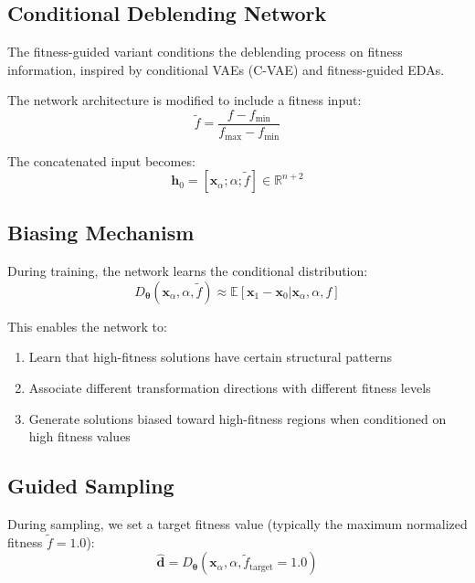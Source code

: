 \documentclass[11pt,a4paper]{article}
\newcommand{\R}{\mathbb{R}}
\newcommand{\E}{\mathbb{E}}
\newcommand{\vx}{\mathbf{x}}
\newcommand{\vtheta}{\boldsymbol{\theta}}
\begin{document}
\subsection{Conditional Deblending Network}

The fitness-guided variant conditions the deblending process on fitness information, inspired by conditional VAEs (C-VAE) and fitness-guided EDAs.

The network architecture is modified to include a fitness input:
\begin{equation}
    \tilde{f} = \frac{f - f_{\min}}{f_{\max} - f_{\min}}
\end{equation}

The concatenated input becomes:
\begin{equation}
    \mathbf{h}_0 = [\vx_\alpha; \alpha; \tilde{f}] \in \R^{n + 2}
\end{equation}

\subsection{Biasing Mechanism}

During training, the network learns the conditional distribution:
\begin{equation}
    D_\vtheta(\vx_\alpha, \alpha, \tilde{f}) \approx \E[\vx_1 - \vx_0 | \vx_\alpha, \alpha, f]
\end{equation}

This enables the network to:
\begin{enumerate}
    \item Learn that high-fitness solutions have certain structural patterns
    \item Associate different transformation directions with different fitness levels
    \item Generate solutions biased toward high-fitness regions when conditioned on high fitness values
\end{enumerate}

\subsection{Guided Sampling}

During sampling, we set a target fitness value (typically the maximum normalized fitness $\tilde{f} = 1.0$):
\begin{equation}
    \hat{\mathbf{d}} = D_\vtheta(\vx_\alpha, \alpha, \tilde{f}_{\text{target}} = 1.0)
\end{equation}
\end{document}
